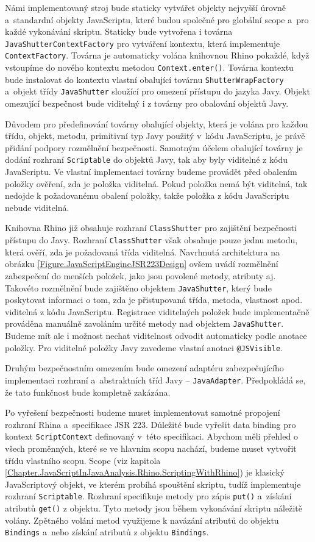 Námi implementovaný stroj bude staticky vytvářet objekty nejvyšší úrovně a~standardní objekty JavaScriptu, které budou společné pro globální scope a~pro každé vykonávání skriptu. Staticky bude vytvořena i továrna \texttt{JavaShutterContextFactory} pro vytváření kontextu, která implementuje \texttt{ContextFactory}. Továrna je automaticky volána knihovnou Rhino pokaždé, když vstoupíme do nového kontextu metodou \texttt{Context.enter()}. Továrna kontextu bude instalovat do kontextu vlastní obalující továrnu \texttt{ShutterWrapFactory} a~objekt třídy \texttt{JavaShutter} sloužící pro omezení přístupu do jazyka Javy. Objekt omezující bezpečnost bude viditelný i z továrny pro obalování objektů Javy.

Důvodem pro předefinování továrny obalující objekty, která je volána pro každou třídu, objekt, metodu, primitivní typ Javy použitý v~kódu JavaScriptu, je právě přidání podpory rozmělnění bezpečnosti. Samotným účelem obalující továrny je dodání rozhraní \texttt{Scriptable} do objektů Javy, tak aby byly viditelné z kódu JavaScriptu. Ve vlastní implementaci továrny budeme provádět před obalením položky ověření, zda je položka viditelná. Pokud položka nemá být viditelná, tak nedojde k požadovanému obalení položky, takže položka z kódu JavaScriptu nebude viditelná.

Knihovna Rhino již obsahuje rozhraní \texttt{ClassShutter} pro zajištění bezpečnosti přístupu do Javy. Rozhraní \texttt{ClassShutter} však obsahuje pouze jednu metodu, která ověří, zda je požadovaná třída viditelná. Navrhnutá architektura na obrázku \ref{Figure.JavaScriptEngineJSR223Design} ovšem uvádí rozmělnění zabezpečení do menších položek, jako jsou povolené metody, atributy aj. Takovéto rozmělnění bude zajištěno objektem \texttt{JavaShutter}, který bude poskytovat informaci o tom, zda je přistupovaná třída, metoda, vlastnost apod. viditelná z kódu JavaScriptu. Registrace viditelných položek bude implementačně prováděna manuálně zavoláním určité metody nad objektem \texttt{JavaShutter}. Budeme mít ale i možnost nechat viditelnost odvodit automaticky podle anotace položky. Pro viditelné položky Javy zavedeme vlastní anotaci \texttt{@JSVisible}. 

Druhým bezpečnostním omezením bude omezení adaptéru zabezpečujícího implementaci rozhraní a~abstraktních tříd Javy -- \texttt{JavaAdapter}. Předpokládá se, že tato funkčnost bude kompletně zakázána.

Po vyřešení bezpečnosti budeme muset implementovat samotné propojení rozhraní Rhina a~specifikace JSR 223. Důležité bude vyřešit data binding pro kontext \texttt{ScriptContext} definovaný v~této specifikaci. Abychom měli přehled o všech proměnných, které se ve hlavním scopu nachází, budeme muset vytvořit třídu vlastního scopu. Scope (viz kapitola \ref{Chapter.JavaScriptInJavaAnalysis.Rhino.ScriptingWithRhino}) je klasický JavaScriptový objekt, ve kterém probíhá spouštění skriptu, tudíž implementuje rozhraní \texttt{Scriptable}. Rozhraní specifikuje metody pro zápis \texttt{put()} a~získání atributů \texttt{get()} z objektu. Tyto metody jsou během vykonávání skriptu náležitě volány. Zpětného volání metod využijeme k navázání atributů do objektu \texttt{Bindings} a~nebo získání atributů z objektu \texttt{Bindings}. 

